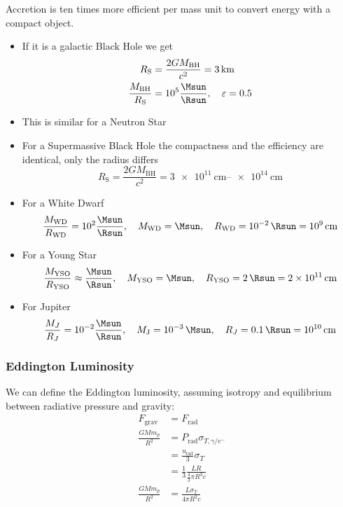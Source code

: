 \documentclass[10pt,a4paper,english]{article}
\begin{document}
Accretion is ten times more efficient per mass unit to convert energy with a compact object.
\begin{itemize}
    \item If it is a galactic Black Hole we get
          \begin{align*}
              R_\mathrm{S} &=\frac{2 G M_\mathrm{BH}}{c^2} = \SI{3}{\km} \\
              \frac{M_\mathrm{BH}}{R_\mathrm{S}} &= 10^5 \frac{\si{\Msun}}{\si{\Rsun}}, \quad \varepsilon = 0.5
          \end{align*}
    \item This is similar for a Neutron Star
    \item For a Supermassive Black Hole the compactness and the efficiency are identical, only the radius differs
          \begin{equation*}
              R_\mathrm{S} =\frac{2 G M_\mathrm{BH}}{c^2} = \SIrange{3e11}{e14}{\cm}
          \end{equation*}
    \item For a White Dwarf
          \begin{equation*}
              \frac{M_\mathrm{WD}}{R_\mathrm{WD}} = 10^2 \frac{\si{\Msun}}{\si{\Rsun}}, \quad M_\mathrm{WD} = \si{\Msun}, \quad R_\mathrm{WD} = \SI{e-2}{\Rsun} = \SI{e9}{\cm}
          \end{equation*}
    \item For a Young Star
          \begin{equation*}
              \frac{M_\mathrm{YSO}}{R_\mathrm{YSO}} \approx \frac{\si{\Msun}}{\si{\Rsun}}, \quad M_\mathrm{YSO} = \si{\Msun}, \quad R_\mathrm{YSO} = \SI{2}{\Rsun} = \SI{2e11}{\cm}
          \end{equation*}
    \item For Jupiter
          \begin{equation*}
              \frac{M_J}{R_J} = 10^{-2} \frac{\si{\Msun}}{\si{\Rsun}}, \quad M_\mathrm{J} = \SI{e-3}{\Msun}, \quad R_J = \SI{0.1}{\Rsun} = \SI{e10}{\cm}
          \end{equation*}
\end{itemize}

\subsubsection{Eddington Luminosity}

We can define the Eddington luminosity, assuming isotropy and equilibrium between radiative pressure and gravity:
\begin{align*}
    F_\mathrm{grav} & = F_\mathrm{rad} \\
    \frac{G M m_p}{R^2} &= P_\mathrm{rad}\sigma_{T,\gamma/e^-} \\
                        &= \frac{u_\mathrm{rad}}{3}\sigma_T \\
                        &= \frac{1}{3}\frac{L R}{\frac{4}{3}\pi R^3 c}\\
    \frac{G M m_p}{R^2} &= \frac{L\sigma_T}{4\pi R^2 c}
\end{align*}
\end{document}
